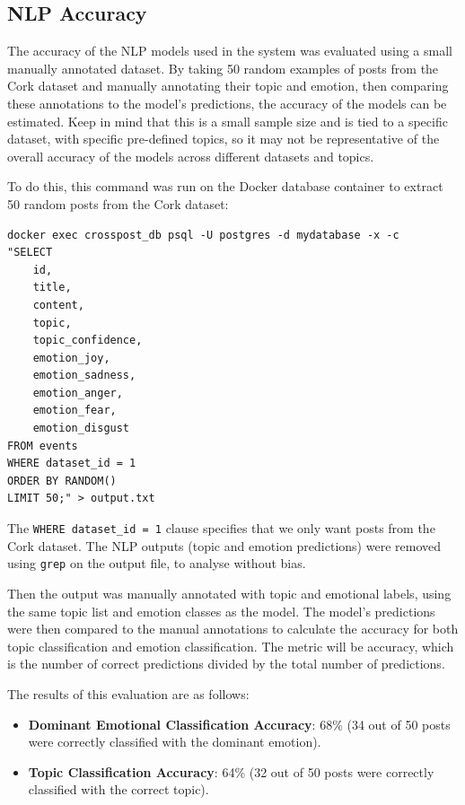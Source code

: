 \documentclass[12pt, a4paper]{article}
\begin{document}
\subsection{NLP Accuracy}
The accuracy of the NLP models used in the system was evaluated using a small manually annotated dataset.  By taking 50 random examples of posts from the Cork dataset and manually annotating their topic and emotion, then comparing these annotations to the model's predictions, the accuracy of the models can be estimated. Keep in mind that this is a small sample size and is tied to a specific dataset, with specific pre-defined topics, so it may not be representative of the overall accuracy of the models across different datasets and topics.

To do this, this command was run on the Docker database container to extract 50 random posts from the Cork dataset:
\begin{verbatim}
docker exec crosspost_db psql -U postgres -d mydatabase -x -c 
"SELECT 
    id, 
    title, 
    content, 
    topic, 
    topic_confidence, 
    emotion_joy, 
    emotion_sadness, 
    emotion_anger, 
    emotion_fear, 
    emotion_disgust
FROM events 
WHERE dataset_id = 1 
ORDER BY RANDOM() 
LIMIT 50;" > output.txt
\end{verbatim}

The \texttt{WHERE dataset\_id = 1} clause specifies that we only want posts from the Cork dataset. The NLP outputs (topic and emotion predictions) were removed using \texttt{grep} on the output file, to analyse without bias.

Then the output was manually annotated with topic and emotional labels, using the same topic list and emotion classes as the model. The model's predictions were then compared to the manual annotations to calculate the accuracy for both topic classification and emotion classification. The metric will be accuracy, which is the number of correct predictions divided by the total number of predictions.

The results of this evaluation are as follows:
\begin{itemize}
    \item \textbf{Dominant Emotional Classification Accuracy}: 68\% (34 out of 50 posts were correctly classified with the dominant emotion).
    \item \textbf{Topic Classification Accuracy}: 64\% (32 out of 50 posts were correctly classified with the correct topic).
\end{itemize}
\end{document}
